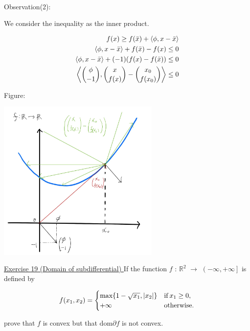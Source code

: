 \documentclass[a4paper,11pt]{jsarticle}
\begin{document}
Observation(2):

We consider the inequality as the inner product.

\begin{equation}
  \begin{split}
    f(x) \geq f(\bar{x}) + \left\langle \phi, x-\bar{x} \right\rangle\\
    \left\langle \phi, x-\bar{x} \right\rangle + f(\bar{x}) - f(x)\leq 0\\
    \left\langle \phi, x-\bar{x} \right\rangle + (-1)(f(x) - f(\bar{x}))\leq 0\\
    \left\langle \binom{\phi}{-1},\binom{x}{f(x)} - \binom{x_0}{f(x_0)} \right\rangle \leq 0 \notag
  \end{split}
\end{equation}

Figure:

\begin{center}
  \includegraphics[width=8cm]{figures/subgradient_(2).png}
\end{center}

\begin{itembox}[l]{\underline{Exercise 19 (Domain of subdifferential) }}
  If the function $f$ : $\mathbb{R}^2$ $\to$ $ \left ( -\infty ,+\infty \right ] $ is defined by

  \begin{equation}
    f(x_1,x_2) =
    \begin{cases}
      \text{max}\{1-\sqrt{x_1}, |x_2|  \} & \text{if}\:x_1 \geq 0, \\
      +\infty & \text{otherwise}. \notag
    \end{cases}
  \end{equation}

  prove that $f$ is convex but that $\text{dom}\partial f$ is not convex.
\end{itembox}
\end{document}
